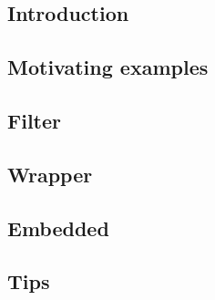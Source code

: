 
\subsection{Introduction}


\subsection{Motivating examples}


\subsection{Filter}


\subsection{Wrapper}


\subsection{Embedded}


\subsection{Tips}



